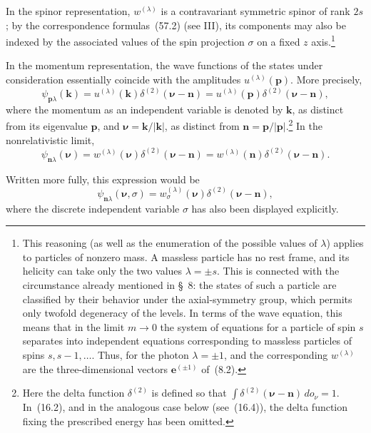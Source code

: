 In the spinor representation, $w^{(\lambda)}$ is a contravariant symmetric spinor of rank $2s$; by the correspondence formulas~(57.2) (see III), its components may also be indexed by the associated values of the spin projection $\sigma$ on a fixed $z$ axis.\footnote{This reasoning (as well as the enumeration of the possible values of $\lambda$) applies to particles of nonzero mass. A massless particle has no rest frame, and its helicity can take only the two values $\lambda=\pm s$. This is connected with the circumstance already mentioned in \S~8: the states of such a particle are classified by their behavior under the axial-symmetry group, which permits only twofold degeneracy of the levels. In terms of the wave equation, this means that in the limit $m\to0$ the system of equations for a particle of spin $s$ separates into independent equations corresponding to massless particles of spins $s,s-1,\ldots$. Thus, for the photon $\lambda=\pm1$, and the corresponding $w^{(\lambda)}$ are the three-dimensional vectors $\mathbf e^{(\pm1)}$ of~(8.2).}

In the momentum representation, the wave functions of the states under consideration essentially coincide with the amplitudes $u^{(\lambda)}(\mathbf p)$. More precisely,
\begin{equation}
\psi_{\mathbf p\lambda}(\mathbf k)
=u^{(\lambda)}(\mathbf k)\delta^{(2)}(\boldsymbol\nu-\mathbf n)
=u^{(\lambda)}(\mathbf p)\delta^{(2)}(\boldsymbol\nu-\mathbf n),
\tag{16.2}
\end{equation}
where the momentum as an independent variable is denoted by $\mathbf k$, as distinct from its eigenvalue $\mathbf p$, and $\boldsymbol\nu=\mathbf k/|\mathbf k|$, as distinct from $\mathbf n=\mathbf p/|\mathbf p|$.\footnote{Here the delta function $\delta^{(2)}$ is defined so that $\int\delta^{(2)}(\boldsymbol\nu-\mathbf n)\,do_\nu=1$. In~(16.2), and in the analogous case below (see~(16.4)), the delta function fixing the prescribed energy has been omitted.} In the nonrelativistic limit,
\begin{equation}
\psi_{\mathbf n\lambda}(\boldsymbol\nu)
=w^{(\lambda)}(\boldsymbol\nu)\delta^{(2)}(\boldsymbol\nu-\mathbf n)
=w^{(\lambda)}(\mathbf n)\delta^{(2)}(\boldsymbol\nu-\mathbf n).
\tag{16.3}
\end{equation}

Written more fully, this expression would be
\[
\psi_{\mathbf n\lambda}(\boldsymbol\nu,\sigma)
=w^{(\lambda)}_\sigma(\boldsymbol\nu)
\delta^{(2)}(\boldsymbol\nu-\mathbf n),
\]
where the discrete independent variable $\sigma$ has also been displayed explicitly.

